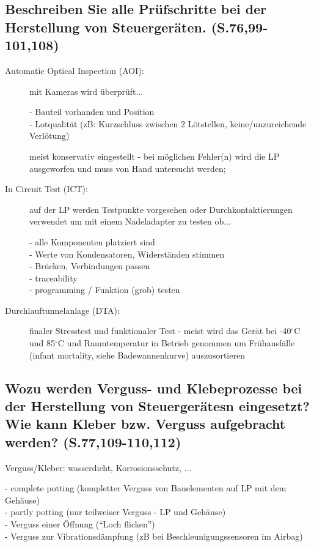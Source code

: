 \subsection{Beschreiben Sie alle Prüfschritte bei der Herstellung von Steuergeräten. (S.76,99-101,108)}
\begin{description}
\item[Automatic Optical Inspection (AOI):] mit Kameras wird überprüft...

  - Bauteil vorhanden und Position \\
  - Lotqualität (zB: Kurzschluss zwischen 2 Lötstellen, keine/unzureichende Verlötung)

  meist konservativ eingestellt - bei möglichen Fehler(n) wird die LP ausgeworfen und muss von 
  Hand untersucht werden;
\item[In Circuit Test (ICT):] auf der LP werden Testpunkte vorgesehen oder Durchkontaktierungen 
  verwendet um mit einem Nadeladapter zu testen ob...

  - alle Komponenten platziert sind \\
  - Werte von Kondensatoren, Widerständen stimmen \\
  - Brücken, Verbindungen passen \\
  - traceability \\
  - programming / Funktion (grob) testen 
\item[Durchlauftunnelanlage (DTA):] finaler Stresstest und funktionaler Test - meist wird das Gerät 
  bei -40$^{\circ}$C und 85$^{\circ}$C und Raumtemperatur in Betrieb genommen um Frühausfälle (infant 
  mortality, siehe Badewannenkurve) auszusortieren
\end{description}

\subsection{Wozu werden Verguss- und Klebeprozesse bei der Herstellung von Steuergerätesn eingesetzt? Wie kann Kleber bzw. Verguss aufgebracht werden? (S.77,109-110,112)}
Verguss/Kleber: wasserdicht, Korrosionsschutz, ...

- complete potting (kompletter Verguss von Bauelementen auf LP mit dem Gehäuse) \\
- partly potting (nur teilweiser Verguss - LP und Gehäuse) \\
- Verguss einer Öffnung (``Loch flicken'') \\
- Verguss zur Vibrationsdämpfung (zB bei Beschleunigungssensoren im Airbag)

